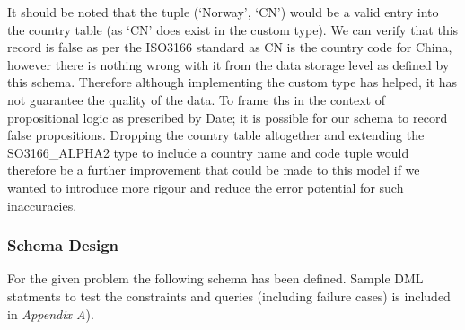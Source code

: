 \documentclass[12pt]{article}
\begin{document}
It should be noted that the tuple (`Norway', `CN') would be a valid entry into the country table (as `CN' does exist in the custom type). We can verify that this record is false as per the ISO3166 standard as CN is the country code for China, however there is nothing wrong with it from the data storage level as defined by this schema. Therefore although implementing the custom type has helped, it has not guarantee the quality of the data. To frame ths in the context of propositional logic as prescribed by Date; it is possible for our schema to record false propositions. Dropping the country table altogether and extending the SO3166\_ALPHA2 type to include a country name and code tuple would therefore be a further improvement that could be made to this model if we wanted to introduce more rigour and reduce the error potential for such inaccuracies.

\subsubsection{Schema Design}
For the given problem the following schema has been defined. Sample DML statments to test the constraints and queries (including failure cases) is included in \emph{Appendix A}).
\end{document}
